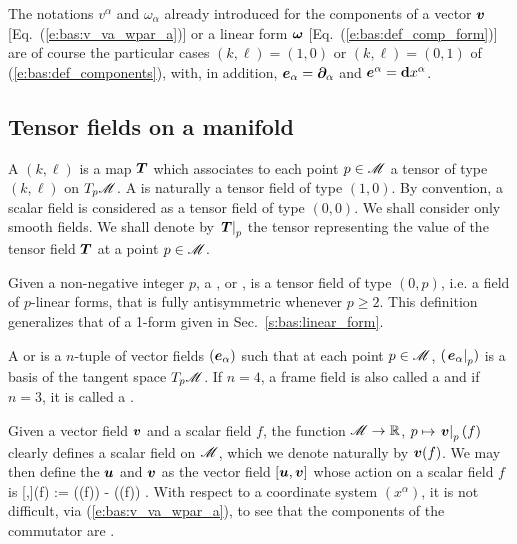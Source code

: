 \begin{remark}
The notations $v^\alpha$ and $\omega_\alpha$ already introduced for the components
of a vector $\bm{v}$ [Eq.~(\ref{e:bas:v_va_wpar_a})]
or a linear form $\bm{\omega}$ [Eq.~(\ref{e:bas:def_comp_form})] are of course the
particular cases $(k,\ell)=(1,0)$ or $(k,\ell)=(0,1)$ of (\ref{e:bas:def_components}), with,
in addition, $\bm{e}_\alpha=\bm{\partial}_\alpha$ and $\bm{e}^\alpha = \mathbf{d} x^\alpha$.
\end{remark}


\subsection{Tensor fields on a manifold} \label{s:bas:fields}

A  $(k,\ell)$ is a map $\bm{T}$
which associates to each point $p\in\mathscr{M}$ a tensor of type $(k,\ell)$ on $T_p\mathscr{M}$.
A  is naturally a tensor field
of type $(1,0)$.
By convention, a scalar field is considered as a tensor field of type $(0,0)$.
We shall consider only smooth fields. We shall denote by $\left. \bm{T} \right| _p$ the tensor
representing the value of the tensor field $\bm{T}$ at a point $p\in\mathscr{M}$.

Given a non-negative integer $p$, a
,
or
, is a tensor field of type $(0,p)$, i.e.
a field of $p$-linear forms, that is fully antisymmetric whenever $p\geq 2$.
This definition generalizes that of a 1-form given in Sec.~\ref{s:bas:linear_form}.

A  or
 is a $n$-tuple of vector fields
$(\bm{e}_\alpha)$ such that at each point $p\in\mathscr{M}$, $(\left. \bm{e}_\alpha\right| _p)$ is
a basis of the tangent space $T_p\mathscr{M}$.
If $n=4$, a frame field is also called a  and if $n=3$,
it is called a
.

Given a vector field $\bm{v}$ and a scalar field $f$, the function
$\mathscr{M}\rightarrow \mathbb{R}$, $p\mapsto \left.\bm{v}\right|_p(f)$ clearly defines a scalar field on
$\mathscr{M}$, which we denote naturally by $\bm{v}(f)$.
We may then define the  $\bm{u}$
and $\bm{v}$ as the vector field $[\bm{u},\bm{v}]$ whose action on a scalar field $f$ is
\be \label{e:bas:def_commutator}
  [,](f) := ((f)) - ((f)) .
\ee
With respect to a coordinate system $(x^\alpha)$, it is not difficult, via
(\ref{e:bas:v_va_wpar_a}), to see that the components of the commutator are
\be \label{e:bas:commut_comp}
   .
\ee

